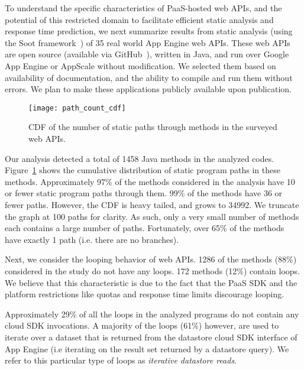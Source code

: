 
To understand the specific characteristics of PaaS-hosted web APIs, and the potential
of this restricted domain to facilitate efficient static analysis and response time 
prediction,  we next summarize results from static analysis (using the Soot
framework~\cite{Vallee-Rai:2010:SJB:1925805.1925818}) of 
35 real world App Engine web APIs. These web APIs are open 
source (available via GitHub~\cite{github}), written in Java, and run over Google App Engine or 
AppScale without modification.
We selected them based on availability of documentation, and the ability 
to compile and run them without errors.
We plan to make these applications publicly available upon publication.  

\begin{figure}
\centering
\texttt{[image: path\_count\_cdf]}
\caption{CDF of the number of static paths through methods in the surveyed web APIs.
\label{fig:path_count_cdf}
}
\vspace{-0.2in}
\end{figure}

Our analysis detected a total of 1458 Java methods in the analyzed codes.
Figure~\ref{fig:path_count_cdf} shows the cumulative distribution of 
static program paths in these methods.
Approximately 97\% of the methods considered in the analysis have 10 or fewer 
static program paths through them.  99\% of 
the methods have 36 or fewer paths.
However, the CDF is heavy tailed, and grows to 34992.
We truncate the graph at 100 paths for clarity. As such, 
only a very small number of methods 
each contains a large number of paths.
Fortunately, over 65\% of the methods have exactly 1 path (i.e. there are no branches).

Next, we consider the looping behavior of web APIs.  1286 of the methods (88\%)
considered in the study
do not have any loops. 172 methods (12\%) contain loops. 
We believe that this characteristic is due to the fact that 
the PaaS SDK and the platform restrictions like quotas and response time limits 
discourage looping.

Approximately 29\% of all the loops in 
the analyzed programs do not contain any cloud SDK invocations. 
A majority of the loops (61\%) however, are
used to iterate over a dataset that is returned from the datastore cloud SDK interface 
of App Engine (i.e iterating on the result set 
returned by a datastore query). We refer to this particular type of 
loops as \textit{iterative datastore reads}. 

